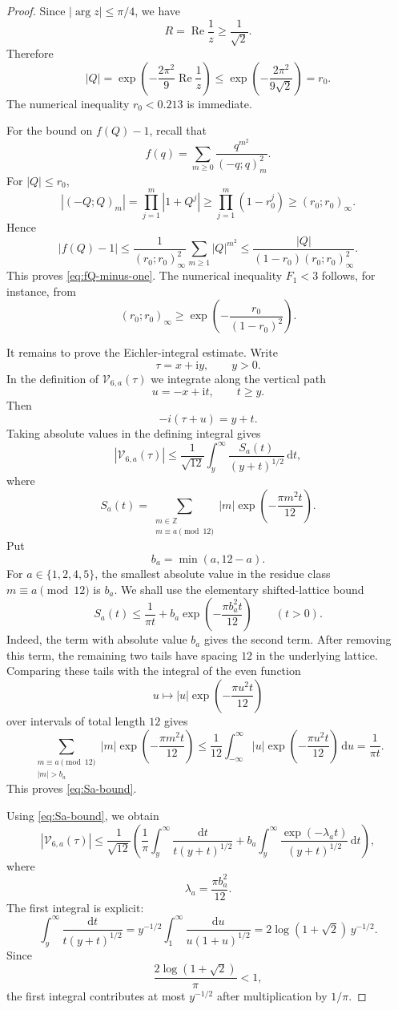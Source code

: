 \documentclass[11pt]{article}
\theoremstyle{remark}
\newcommand{\ii}{\mathrm i}
\newcommand{\dd}{\mathrm d}
\newcommand{\Repart}{\operatorname{Re}}
\begin{document}
\begin{proof}
Since $|\arg z|\leq\pi/4$, we have
\[
R=\Repart\frac1z\geq\frac1{\sqrt2}.
\]
Therefore
\[
|Q|=\exp\left(-\frac{2\pi^2}{9}\Repart\frac1z\right)
\leq
\exp\left(-\frac{2\pi^2}{9\sqrt2}\right)=r_0.
\]
The numerical inequality $r_0<0.213$ is immediate.

For the bound on $f(Q)-1$, recall that
\[
f(q)=\sum_{m\geq0}\frac{q^{m^2}}{(-q;q)_m^2}.
\]
For $|Q|\leq r_0$,
\[
|(-Q;Q)_m|
=
\prod_{j=1}^{m}|1+Q^j|
\geq
\prod_{j=1}^{m}(1-r_0^j)
\geq
(r_0;r_0)_\infty.
\]
Hence
\[
|f(Q)-1|
\leq
\frac1{(r_0;r_0)_\infty^2}
\sum_{m\geq1}|Q|^{m^2}
\leq
\frac{|Q|}{(1-r_0)(r_0;r_0)_\infty^2}.
\]
This proves \eqref{eq:fQ-minus-one}.  The numerical inequality $F_1<3$ follows, for instance, from
\[
(r_0;r_0)_\infty
\geq
\exp\left(-\frac{r_0}{(1-r_0)^2}\right).
\]

It remains to prove the Eichler-integral estimate.  Write
\[
\tau=x+\ii y,
\qquad y>0.
\]
In the definition of $\mathcal V_{6,a}(\tau)$ we integrate along the vertical path
\[
u=-x+\ii t,
\qquad t\geq y.
\]
Then
\[
-i(\tau+u)=y+t.
\]
Taking absolute values in the defining integral gives
\[
|\mathcal V_{6,a}(\tau)|
\leq
\frac1{\sqrt{12}}
\int_y^\infty \frac{S_a(t)}{(y+t)^{1/2}}\,\dd t,
\]
where
\[
S_a(t)
=
\sum_{\substack{m\in\mathbb Z\\ m\equiv a\pmod{12}}}
|m|\exp\left(-\frac{\pi m^2t}{12}\right).
\]
Put
\[
b_a=\min(a,12-a).
\]
For $a\in\{1,2,4,5\}$, the smallest absolute value in the residue class
$m\equiv a\pmod {12}$ is $b_a$.  We shall use the elementary shifted-lattice bound
\begin{equation}\label{eq:Sa-bound}
S_a(t)
\leq
\frac1{\pi t}
+
b_a\exp\left(-\frac{\pi b_a^2t}{12}\right)
\qquad(t>0).
\end{equation}
Indeed, the term with absolute value $b_a$ gives the second term.  After removing this term, the remaining two tails have spacing $12$ in the underlying lattice.  Comparing these tails with the integral of the even function
\[
u\mapsto |u|\exp\left(-\frac{\pi u^2t}{12}\right)
\]
over intervals of total length $12$ gives
\[
\sum_{\substack{m\equiv a\pmod{12}\\ |m|>b_a}}
|m|\exp\left(-\frac{\pi m^2t}{12}\right)
\leq
\frac1{12}\int_{-\infty}^{\infty}
|u|\exp\left(-\frac{\pi u^2t}{12}\right)\,\dd u
=
\frac1{\pi t}.
\]
This proves \eqref{eq:Sa-bound}.

Using \eqref{eq:Sa-bound}, we obtain
\[
|\mathcal V_{6,a}(\tau)|
\leq
\frac1{\sqrt{12}}
\left(
\frac1\pi
\int_y^\infty \frac{\dd t}{t(y+t)^{1/2}}
+
b_a\int_y^\infty
\frac{\exp(-\lambda_a t)}{(y+t)^{1/2}}\,\dd t
\right),
\]
where
\[
\lambda_a=\frac{\pi b_a^2}{12}.
\]
The first integral is explicit:
\[
\int_y^\infty \frac{\dd t}{t(y+t)^{1/2}}
=
y^{-1/2}
\int_1^\infty \frac{\dd u}{u(1+u)^{1/2}}
=
2\log(1+\sqrt2)\,y^{-1/2}.
\]
Since
\[
\frac{2\log(1+\sqrt2)}{\pi}<1,
\]
the first integral contributes at most $y^{-1/2}$ after multiplication by $1/\pi$.


\end{proof}
\end{document}
